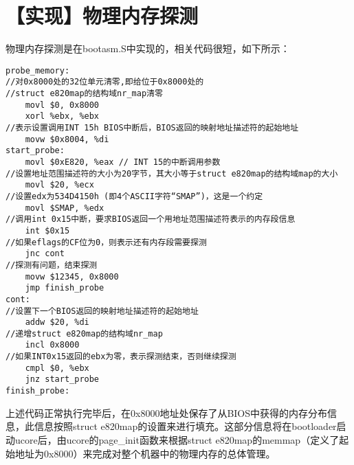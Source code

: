 \section{【实现】物理内存探测}\label{ux5b9eux73b0ux7269ux7406ux5185ux5b58ux63a2ux6d4b}

物理内存探测是在bootasm.S中实现的，相关代码很短，如下所示：

\begin{lstlisting}
probe_memory:
//对0x8000处的32位单元清零,即给位于0x8000处的
//struct e820map的结构域nr_map清零
    movl $0, 0x8000     
    xorl %ebx, %ebx    
//表示设置调用INT 15h BIOS中断后，BIOS返回的映射地址描述符的起始地址
    movw $0x8004, %di 
start_probe:
    movl $0xE820, %eax // INT 15的中断调用参数
//设置地址范围描述符的大小为20字节，其大小等于struct e820map的结构域map的大小
    movl $20, %ecx  
//设置edx为534D4150h (即4个ASCII字符“SMAP”)，这是一个约定
    movl $SMAP, %edx
//调用int 0x15中断，要求BIOS返回一个用地址范围描述符表示的内存段信息
    int $0x15
//如果eflags的CF位为0，则表示还有内存段需要探测
    jnc cont
//探测有问题，结束探测
    movw $12345, 0x8000
    jmp finish_probe
cont:
//设置下一个BIOS返回的映射地址描述符的起始地址
    addw $20, %di
//递增struct e820map的结构域nr_map
    incl 0x8000
//如果INT0x15返回的ebx为零，表示探测结束，否则继续探测
    cmpl $0, %ebx
    jnz start_probe
finish_probe:
\end{lstlisting}

上述代码正常执行完毕后，在0x8000地址处保存了从BIOS中获得的内存分布信息，此信息按照struct
e820map的设置来进行填充。这部分信息将在bootloader启动ucore后，由ucore的page\_init函数来根据struct
e820map的memmap（定义了起始地址为0x8000）来完成对整个机器中的物理内存的总体管理。
